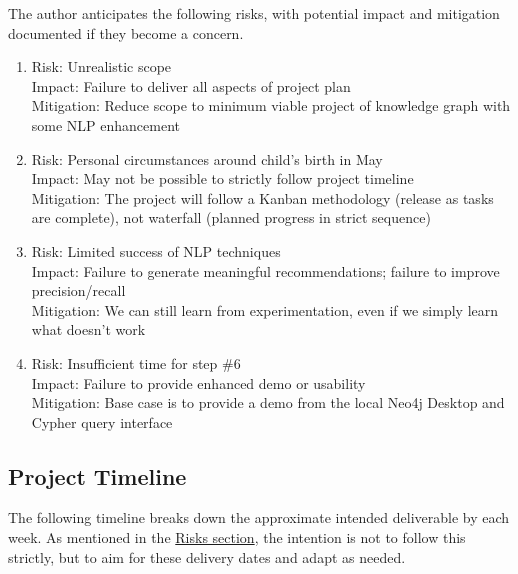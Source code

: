 \documentclass[11pt]{article}
\begin{document}
The author anticipates the following risks, with potential impact and mitigation documented if they become a concern.

\begin{enumerate}
\item Risk: Unrealistic scope \\
Impact: Failure to deliver all aspects of project plan \\
Mitigation: Reduce scope to minimum viable project of knowledge graph with some NLP enhancement
\item Risk: Personal circumstances around child's birth in May \\
Impact: May not be possible to strictly follow project timeline \\
Mitigation: The project will follow a Kanban methodology (release as tasks are complete), not waterfall (planned progress in strict sequence)
\item Risk: Limited success of NLP techniques \\
Impact: Failure to generate meaningful recommendations; failure to improve precision/recall \\
Mitigation: We can still learn from experimentation, even if we simply learn what doesn’t work
\item Risk: Insufficient time for step \#6 \\
Impact: Failure to provide enhanced demo or usability \\
Mitigation: Base case is to provide a demo from the local Neo4j Desktop and Cypher query interface
\end{enumerate}


\subsection{Project Timeline}
The following timeline breaks down the approximate intended deliverable by each week. As mentioned in the \hyperref[sec:RisksMitigation]{Risks section}, the intention is not to follow this strictly, but to aim for these delivery dates and adapt as needed.
\end{document}
